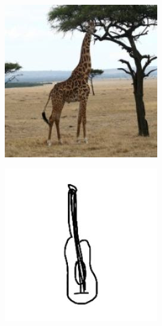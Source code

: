 \documentclass{article}
\begin{document}
\begin{center}
    \noindent
    \begin{minipage}{0.142\textwidth}
        \includegraphics[width=\linewidth]{./pic/misclassified_r2_p5_2723.jpg}
    \end{minipage}%
    \begin{minipage}{0.142\textwidth}
        \includegraphics[width=\linewidth]{./pic/misclassified_r3_p0_2723.jpg}

\end{minipage}
\end{center}
\end{document}
